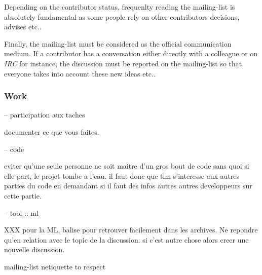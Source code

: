 Depending on the contributor status, frequenlty reading the mailing-list is
absolutely fundamental as some people rely on other contributors decisions,
advises etc..

Finally, the mailing-list must be considered as the official communication
medium. If a contributor has a conversation either directly with a colleague
or on \textit{IRC} for instance, the discussion must be reported on the
mailing-list so that everyone takes into account these new ideas etc..


\subsubsection{Work}

--
participation aux taches

documenter ce que vous faites.

%
%

-- code

eviter qu'une seule personne ne soit maitre d'un gros bout de code sans
quoi si elle part, le projet tombe a l'eau. il faut donc que tlm s'interesse
aux autres parties du code en demandant si il faut des infos autres autres
developpeurs sur cette partie.

-- tool :: ml

XXX pour la ML, balise pour retrouver facilement dans les archives.
Ne repondre qu'en relation avec le topic de la discussion. si c'est autre
chose alors creer une nouvelle discussion.

mailing-list netiquette to respect
